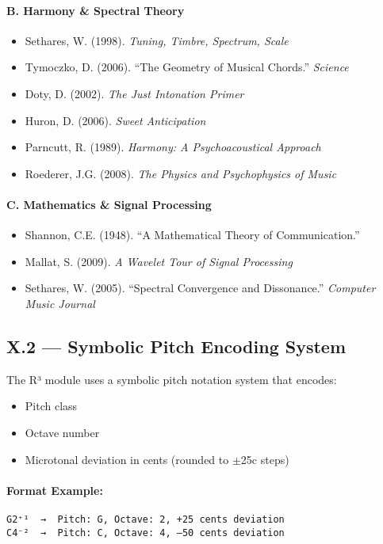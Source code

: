 \paragraph{B. Harmony \& Spectral Theory}
\begin{itemize}
    \item Sethares, W. (1998). \textit{Tuning, Timbre, Spectrum, Scale}
    \item Tymoczko, D. (2006). “The Geometry of Musical Chords.” \textit{Science}
    \item Doty, D. (2002). \textit{The Just Intonation Primer}
    \item Huron, D. (2006). \textit{Sweet Anticipation}
    \item Parncutt, R. (1989). \textit{Harmony: A Psychoacoustical Approach}
    \item Roederer, J.G. (2008). \textit{The Physics and Psychophysics of Music}
\end{itemize}

\paragraph{C. Mathematics \& Signal Processing}
\begin{itemize}
    \item Shannon, C.E. (1948). “A Mathematical Theory of Communication.”
    \item Mallat, S. (2009). \textit{A Wavelet Tour of Signal Processing}
    \item Sethares, W. (2005). “Spectral Convergence and Dissonance.” \textit{Computer Music Journal}
\end{itemize}

\subsection*{X.2 — Symbolic Pitch Encoding System}

The R³ module uses a symbolic pitch notation system that encodes:

\begin{itemize}
    \item Pitch class
    \item Octave number
    \item Microtonal deviation in cents (rounded to $\pm$25c steps)
\end{itemize}

\paragraph{Format Example:}
\begin{verbatim}
G2⁺¹  →  Pitch: G, Octave: 2, +25 cents deviation
C4⁻²  →  Pitch: C, Octave: 4, –50 cents deviation
\end{verbatim}

